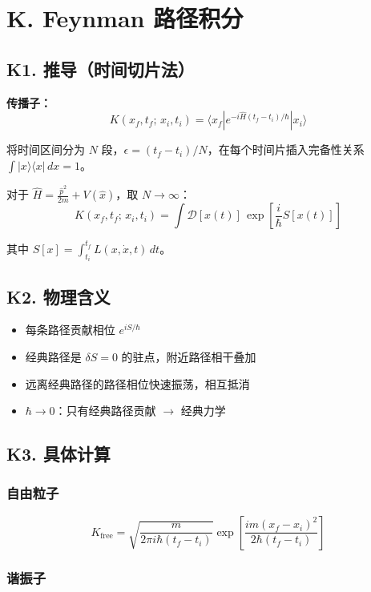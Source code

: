 \section{K. Feynman 路径积分}
\label{sec:path-integral}

\subsection{K1. 推导（时间切片法）}

\textbf{传播子：}
\[
K(x_f, t_f;\, x_i, t_i) = \langle x_f | e^{-i\hat{H}(t_f-t_i)/\hbar} | x_i \rangle
\]

将时间区间分为 $N$ 段，$\epsilon = (t_f - t_i)/N$，在每个时间片插入完备性关系 $\int |x\rangle\langle x|\,dx = 1$。

对于 $\hat{H} = \frac{\hat{p}^2}{2m} + V(\hat{x})$，取 $N \to \infty$：
\[
\boxed{K(x_f, t_f;\, x_i, t_i) = \int \mathcal{D}[x(t)]\, \exp\left[\frac{i}{\hbar}S[x(t)]\right]}
\]

其中 $S[x] = \displaystyle\int_{t_i}^{t_f} L(x, \dot{x}, t)\,dt$。

\subsection{K2. 物理含义}

\begin{itemize}
  \item 每条路径贡献相位 $e^{iS/\hbar}$
  \item 经典路径是 $\delta S = 0$ 的驻点，附近路径相干叠加
  \item 远离经典路径的路径相位快速振荡，相互抵消
  \item $\hbar \to 0$：只有经典路径贡献 $\to$ 经典力学
\end{itemize}

\subsection{K3. 具体计算}

\subsubsection{自由粒子}

\[
K_{\text{free}} = \sqrt{\frac{m}{2\pi i\hbar(t_f-t_i)}} \exp\left[\frac{im(x_f-x_i)^2}{2\hbar(t_f-t_i)}\right]
\]

\subsubsection{谐振子}

